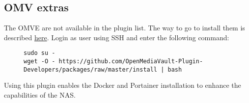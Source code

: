 

\subsection{OMV extras}

The \gls{OMVE} are not available in the plugin list. The way to go to install
them is described \href{https://forum.openmediavault.org/index.php?thread/39594-omvextras-for-omv6/}{here}.
Login as user  using SSH and enter the following command:

\begin{figure}[H]
    \centering
    \begin{tiny}
        \begin{BVerbatim}
sudo su -
wget -O - https://github.com/OpenMediaVault-Plugin-Developers/packages/raw/master/install | bash
        \end{BVerbatim}
    \end{tiny}
\end{figure}

Using this plugin enables the \gls{Docker} and \gls{Portainer} installation
to enhance the capabilities of the \gls{NAS}.

